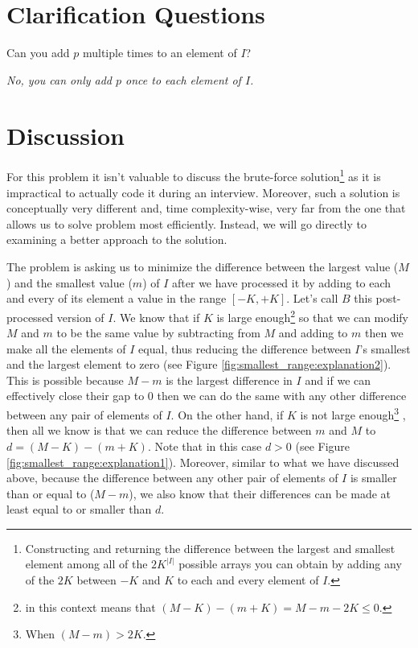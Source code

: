 \section{Clarification Questions}

\begin{QandA}
	\begin{questionitem} \begin{question} Can you add $p$ multiple times to an element of $I$?  \end{question} 	 
    \begin{answered}
		\textit{No, you can only add $p$ once to each element of $I$.}
	\end{answered} \end{questionitem}	
\end{QandA}

\section{Discussion}
\label{smallest_range:sec:discussionMain}
For this problem it isn't valuable to discuss the brute-force solution\footnote{Constructing
	and returning the difference between the largest and smallest element among all of the
	$2K^{|I|}$ possible arrays you can obtain by adding any of the $2K$ between $-K$ and $K$ to each
	and every element of $I$.} as it is impractical to actually code it during an interview.
	Moreover, such a solution is conceptually very different and,  time complexity-wise, very far from the one that allows us to solve problem most efficiently. Instead, we will go directly to examining a better approach to the solution. 
	

The problem is asking us to minimize the difference between the largest value ($M$) and the smallest
value ($m$) of $I$ after we have processed it by adding to each and every of its element a value in
the range $[-K,+K]$. Let's call $B$ this post-processed version of $I$. We know that if $K$ is large
enough\footnote{  in this context means that $(M-K) - (m+K) = M-m-2K \leq 0$.} so
that we can modify $M$ and $m$ to be the same value by subtracting from $M$ and adding to $m$ then
we make all the elements of $I$ equal, thus reducing the difference between $I$'s smallest and the
largest element to zero (see Figure \ref{fig:smallest_range:explanation2}). This is possible because
$M-m$ is the  largest difference in $I$ and if we can effectively close their gap to $0$ then we can
do the same with any other difference between any pair of elements of $I$. On the other hand, if $K$
is not large enough\footnote{When $(M-m) > 2K$.} , then all we know is that we can reduce the
difference between $m$ and $M$ to $d=(M-K)-(m+K)$. Note that in this case $d > 0$  (see Figure
\ref{fig:smallest_range:explanation1}). Moreover, similar to what we have discussed above, because
the difference between any other pair of elements of $I$ is smaller than or equal to ($M-m$), we also
know that their differences can be made at least equal to or smaller than $d$.


